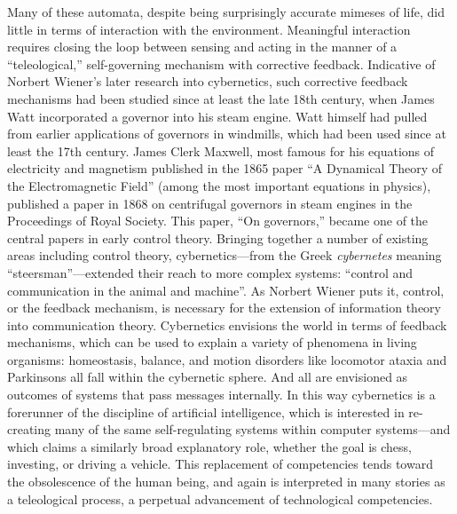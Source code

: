 Many of these automata, despite being surprisingly accurate
mimeses of life, did little in terms of interaction with the
environment. Meaningful interaction requires closing the loop between
sensing and acting in the manner of a
 ``teleological,'' self-governing mechanism with corrective feedback.
 Indicative of Norbert Wiener's later research into cybernetics, such
 corrective feedback mechanisms had been studied since at least the
 late 18th century, when James Watt incorporated a governor into his
 steam engine. Watt himself had pulled from earlier applications of
 governors in windmills, which had been used since at least the 17th
 century.\cite{richardhills} James Clerk Maxwell, most famous for his equations of
 electricity and magnetism published in the 1865 paper ``A Dynamical
 Theory of the Electromagnetic Field'' (among the most important
 equations in physics), published a paper in 1868 on centrifugal
 governors in steam engines in the Proceedings of Royal Society. This
 paper, ``On governors,'' became one of the central papers in early
 control theory.\cite{ottomayr} Bringing together a number of existing
 areas including control theory,
 cybernetics---from the Greek \emph{cybernetes} meaning
 ``steersman''\cite[p. 6]{wienerMainIdeas}---extended their reach to more complex
 systems: ``control and communication in the animal and machine''. As
 Norbert Wiener puts it, control, or the
 feedback mechanism, is necessary for the extension of information
 theory into communication theory. Cybernetics envisions the world in
 terms of feedback mechanisms, which can be used to explain a variety
 of phenomena in living organisms: homeostasis, balance, and motion
 disorders like locomotor ataxia and Parkinsons all fall within the
 cybernetic sphere\cite[p. 10-15]{wienerMainIdeas}. And all are envisioned
 as outcomes of systems that pass messages internally. In this way
 cybernetics is a forerunner of the discipline of
 artificial intelligence, which is interested in re-creating many of the same
 self-regulating systems within computer systems---and which claims a
 similarly broad explanatory role, whether the goal is chess,
 investing, or driving a vehicle. This replacement of
 competencies tends toward the obsolescence of the human being, and
 again is interpreted in many stories as a teleological process, a
 perpetual advancement of technological competencies.



